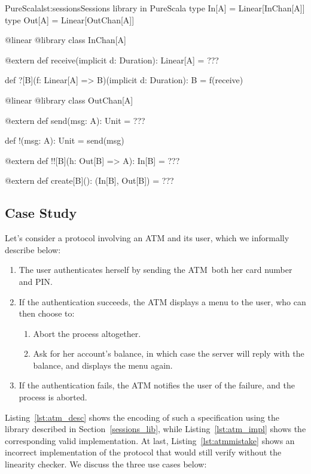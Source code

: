 \documentclass[a4paper,twoside]{article}
\newcommand{\RefSec}[1]{Section~\ref{#1}}
\newcommand{\RefCode}[1]{Listing~\ref{#1}}
\begin{document}
\begin{Code}{PureScala}{lst:sessions}{Sessions library in PureScala}
type In[A]  = Linear[InChan[A]]
type Out[A] = Linear[OutChan[A]]

@linear @library
class InChan[A] {

  @extern
  def receive(implicit d: Duration): Linear[A] = {
    ???
  }

  def ?[B](f: Linear[A] => B)(implicit d: Duration): B = {
    f(receive)
  }
}

@linear @library
class OutChan[A] {

  @extern
  def send(msg: A): Unit = {
    ???
  }

  def !(msg: A): Unit = {
    send(msg)
  }

  @extern
  def !![B](h: Out[B] => A): In[B] = {
    ???
  }

  @extern
  def create[B](): (In[B], Out[B]) = {
    ???
  }
}
\end{Code}

\subsection{Case Study}

Let's consider a protocol involving an ATM and its user, which we informally describe below:

\begin{enumerate}[label=\Alph*]
\item The user authenticates herself by sending the ATM both her card number and PIN.
\item If the authentication succeeds, the ATM displays a menu to the user, who can then choose to:
\begin{enumerate}
\item Abort the process altogether.
\item Ask for her account's balance, in which case the server will reply with the balance, and displays the menu again.
\end{enumerate}
\item If the authentication fails, the ATM notifies the user of the failure, and the process is aborted.
\end{enumerate}

\RefCode{lst:atm_desc} shows the encoding of such a specification using the library described in \RefSec{sessions_lib}, while \RefCode{lst:atm_impl} shows the corresponding valid implementation. At last, \RefCode{lst:atmmistake} shows an incorrect implementation of the protocol that would still verify without the linearity checker. We discuss the three use cases below:
\end{document}
